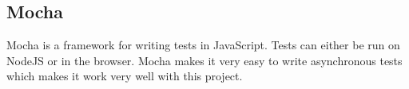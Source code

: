 \subsection{Mocha}
Mocha is a framework for writing tests in JavaScript. Tests can either be run on NodeJS or in the browser. Mocha makes it very easy to write asynchronous tests which makes it work very well with this project. 